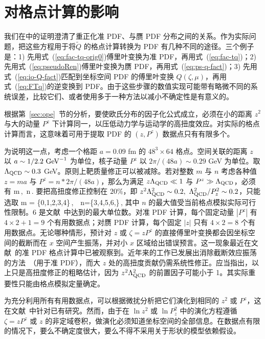 \section{对格点计算的影响}
\label{sec:lattice}

我们在中的证明澄清了重正化准 PDF、\spcorr 与赝 PDF 分布之间的关系。作为实际问题，把这些方程用于将\spcorr $\tilde Q$ 的格点计算转换为 PDF 有几种不同的途径。三个例子是：1) 先用式~(\ref{eq:fac-tq-orig0})傅里叶变换为准 PDF，再用式~(\ref{eq:fac-tq})；2) 先用式~(\ref{eq:pseudoRen})傅里叶变换为赝 PDF，再用式~(\ref{eq:ps-q-fact})；3) 先用式~(\ref{eq:io-Q-fact})匹配到坐标空间 PDF 的傅里叶变换 $Q(\zeta,\mu)$，再用式~(\ref{eq:FTq})的逆变换到 PDF。由于这些步骤的数值实现可能带有略微不同的系统误差，比较它们、或者使用多于一种方法以减小不确定性是有意义的。

根据第~\ref{sec:ope}~节的分析，要使欧氏分布的因子化公式成立，必须在小的距离 $z^2$ 与大的动量 $P^z$ 下计算同一\spcorr，以压低动力学与运动学的高扭度效应。对实际的格点计算而言，这意味着可用于提取 PDF 的 $(z, P^z)$ 数据点只有有限多个。

为说明这一点，考虑一个格距 $a=0.09$ fm 的 $48^3\times64$ 格点。空间关联的距离 $z$ 以 $a\sim1/2.2\ {\rm GeV}^{-1}$ 为单位，核子动量 $P^z$ 以 $2\pi/(48a)\sim0.29$ GeV 为单位。取 $\Lambda_{\rm QCD}\sim 0.3$ GeV。原则上靶质量修正可以被减除。若对整数 $m$ 与 $n$ 考虑各种值 $z=ma$ 与 $P^z=n*2\pi/(48a)$，那么为满足 $z\Lambda_{\rm QCD}\ll1$ 与 $P^z\gg \Lambda_{\rm QCD}$，必须有
\beq
 m\,,\,\,\,\quad n\,.
\eeq
要把高扭度修正控制在 $20\%$，即 $z^2\Lambda_{\rm QCD}^2\sim0.2,\ \Lambda_{\rm QCD}^2/P_z^2\sim0.2$，只能选取
\beq
m = \{0,1,2,3,4\}\,,\,\,\,\, n=\{3,4,5,6,\cdots\}\,,
\eeq
其中 $n$ 的最大值受当前格点模拟实际可行性限制。6 是文献~\cite{Orginos:2017kos}中达到的最大单位数。对准 PDF 计算，每个固定动量 $|P^z|$ 有 $4\times2+1=9$ 个有用数据点；对赝 PDF 计算，每个固定 $|z|$ 只有 $4\times2=8$ 个有用数据点。无论哪种情形，预计对 $z$ 或 $\zeta=zP^z$ 的直接傅里叶变换都会因坐标空间的截断而在 $x$ 空间产生振荡，并对小 $x$ 区域给出错误预言。这一现象最近在文献~\cite{Chen:2017mzz}的准 PDF 格点计算中已被观察到。近年来的工作已发展出消除截断效应振荡的方法~\cite{Lin:2017ani,Zhang:2017gau}（用于准 PDF），而大 $z$ 处的高扭度贡献仍需系统性修正。应当指出，以上只是高扭度修正的粗略估计，因为 $z^2\Lambda_{\rm QCD}^2$ 的前置因子可能小于 1。其实际重要性只能由格点模拟定量确定。

为充分利用所有有用数据点，可以根据微扰分析把它们演化到相同的 $z^2$ 或 $P^z$，这在文献~\cite{Orginos:2017kos,Karpie:2017bzm,Radyushkin:2017lvu}中针对\spcorr 已有研究。然而，由于\spcorr 在 $\ln z^2$ 或 $\ln P_z^2$ 中的演化方程遵循 $\zeta=zP^z$ 或 $z$ 的非定域卷积，做演化必须知道坐标空间的全部信息。在数据点有限的情况下，要么不确定度很大，要么不得不采用关于形状的模型依赖假设。

